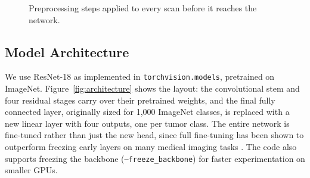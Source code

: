 \documentclass[twocolumn]{article}
\begin{document}
\begin{figure}[H]
\centering
{}
\caption{Preprocessing steps applied to every scan before it reaches the network.}
\label{fig:preprocessing}
\end{figure}

\subsection{Model Architecture}
\label{sec:architecture}
We use ResNet-18 as implemented in \texttt{torchvision.models}, pretrained on ImageNet. Figure~\ref{fig:architecture} shows the layout: the convolutional stem and four residual stages carry over their pretrained weights, and the final fully connected layer, originally sized for 1,000 ImageNet classes, is replaced with a new linear layer with four outputs, one per tumor class. The entire network is fine-tuned rather than just the new head, since full fine-tuning has been shown to outperform freezing early layers on many medical imaging tasks \citep{tajbakhsh2016convolutional}. The code also supports freezing the backbone (\texttt{--freeze\_backbone}) for faster experimentation on smaller GPUs.
\end{document}
